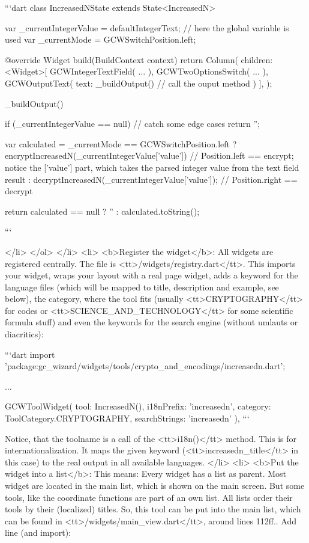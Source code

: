 ```dart
class IncreasedNState extends State<IncreasedN> {

  var _currentIntegerValue = defaultIntegerText; // here the global variable is used
  var _currentMode = GCWSwitchPosition.left;

  @override
  Widget build(BuildContext context) {
    return Column(
      children: <Widget>[
        GCWIntegerTextField(
          ...
        ),
        GCWTwoOptionsSwitch(
          ...
        ),
        GCWOutputText(
          text: _buildOutput()            // call the ouput method
        )
      ],
    );
  }

  _buildOutput() {
    if (_currentIntegerValue == null)      // catch some edge cases
      return '';

    var calculated = _currentMode == GCWSwitchPosition.left
      ? encryptIncreasedN(_currentIntegerValue['value'])  // Position.left == encrypt; notice the ['value'] part, which takes the parsed integer value from the text field result
      : decryptIncreasedN(_currentIntegerValue['value']); // Position.right == decrypt

    return calculated == null ? '' : calculated.toString();
  }
}
```
        
</li>
		</ol>
	</li>
	<li>
		<b>Register the widget</b>: All widgets are registered centrally. The file is <tt>/widgets/registry.dart</tt>. This imports your widget, wraps your layout with a real page widget, adds a keyword for the language files (which will be mapped to title, description and example, see below), the category, where the tool fits (usually <tt>CRYPTOGRAPHY</tt> for codes or <tt>SCIENCE_AND_TECHNOLOGY</tt> for some scientific formula stuff) and even the keywords for the search engine (without umlauts or diacritics):
	
```dart
import 'package:gc_wizard/widgets/tools/crypto_and_encodings/increasedn.dart';

...

GCWToolWidget(
  tool: IncreasedN(), 
  i18nPrefix: 'increasedn', 
  category: ToolCategory.CRYPTOGRAPHY,
  searchStrings: 'increasedn'
),
```

Notice, that the toolname is a call of the <tt>i18n()</tt> method. This is for internationalization. It maps the given keyword (<tt>increasedn_title</tt> in this case) to the real output in all available languages. 
  </li>
	<li>
		<b>Put the widget into a list</b>: This means: Every widget has a list as parent. Most widget are located in the main list, which is shown on the main screen. But some tools, like the coordinate functions are part of an own list. All lists order their tools by their (localized) titles. So, this tool can be put into the main list, which can be found in <tt>/widgets/main_view.dart</tt>, around lines 112ff.. Add line (and import):
  
